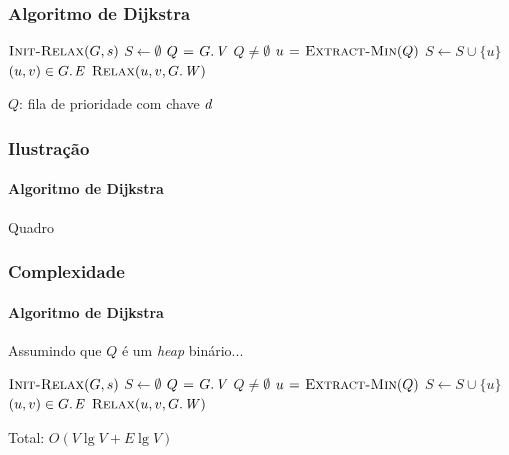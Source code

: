 \documentclass{beamer}
\begin{document}
\begin{frame}
\frametitle{Algoritmo de Dijkstra}

\begin{codebox}
\li $\textnormal{\scshape Init-Relax}(G, s)$
\li $S \gets \emptyset$
\li $Q \gets \attrib{G}{V}$
\li \While $Q \neq \emptyset$
\li \Do $u \mathrel{\hspace{1pt}=\hspace{1pt}} \textnormal{\scshape Extract-Min}(Q)$
\li   $S \gets S \cup \{ u \}$
\li   \For $(u, v) \in \attrib{G}{E}$
\li   \Do $\proc{Relax}(u, v, \attrib{G}{W})$
      \End
    \End
\end{codebox}
$Q$: fila de prioridade com chave $\id{d}$

\end{frame}

\begin{frame}
\frametitle{Ilustração}
\framesubtitle{Algoritmo de Dijkstra}

Quadro

\end{frame}

\begin{frame}
\frametitle{Complexidade}
\framesubtitle{Algoritmo de Dijkstra}

Assumindo que $Q$ é um \textit{heap\/} binário...

\begin{codebox}
\li $\textnormal{\scshape Init-Relax}(G, s)$ 
\li $S \gets \emptyset$
\li $Q \gets \attrib{G}{V}$ 
\li \While $Q \neq \emptyset$  
\li \Do $u \mathrel{\hspace{1pt}=\hspace{1pt}} \textnormal{\scshape Extract-Min}(Q)$  
\li   $S \gets S \cup \{ u \}$
\li   \For $(u, v) \in \attrib{G}{E}$ 
\li   \Do $\proc{Relax}(u, v, \attrib{G}{W})$ 
      \End
    \End
\end{codebox}
\pause
\begin{center}
Total: \alert{$O(V \lg V + E \lg V)$}
\end{center}
\end{frame}
\end{document}
